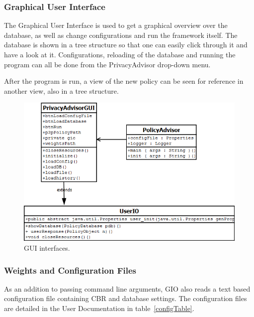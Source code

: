 \subsubsection{Graphical User Interface} 
The Graphical User Interface is used to get a graphical overview over the database, as well as change configurations and run the framework itself. The database is shown in a tree structure so that one can easily click through it and have a look at it. Configurations, reloading of the database and running the program can all be done from the PrivacyAdvisor drop-down menu.

After the program is run, a view of the new policy can be seen for reference in another view, also in a tree structure.

\begin{figure}[htbp]
\begin{center}
\includegraphics[width = \textwidth]{DesignReport/uml/policyadvisorgui}
\caption{GUI interfaces.}
\label{GUI_interface}
\end{center}
\end{figure}

\subsubsection{Weights and Configuration Files}
As an addition to passing command line arguments, GIO also reads a text based configuration file containing CBR and database settings. The configuration files are detailed in the User Documentation in table~\ref{configTable}. 